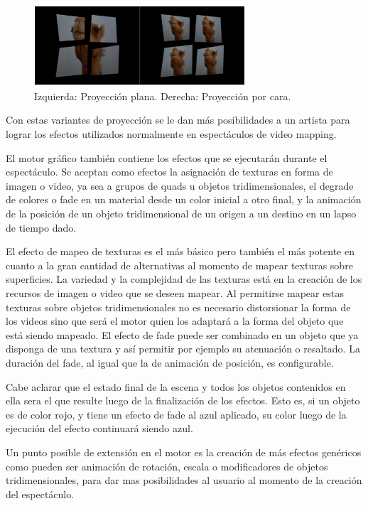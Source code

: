 \begin{figure}[H]
  \centering
    \includegraphics[width=0.7\textwidth]{./Cap5_vmt/vmtengine-maping.png}
  \caption{Izquierda: Proyección plana. Derecha: Proyección por cara.}
  \label{fig:VMT-Projection}
\end{figure}

Con estas variantes de proyección se le dan más posibilidades a un artista para lograr los efectos utilizados normalmente en espectáculos de video mapping.

El motor gráfico también contiene los efectos que se ejecutarán durante el espectáculo. Se aceptan como efectos la asignación de texturas en forma de imagen o video, ya sea a grupos de quads u objetos tridimensionales, el degrade de colores o fade en un material desde un color inicial a otro final, y la animación de la posición de un objeto tridimensional de un origen a un destino en un lapso de tiempo dado.

El efecto de mapeo de texturas es el más básico pero también el más potente en cuanto a la gran cantidad de alternativas al momento de mapear texturas sobre superficies. La variedad y la complejidad de las texturas está en la creación de los recursos de imagen o video que se deseen mapear. Al permitirse mapear estas texturas sobre objetos tridimensionales no es necesario distorsionar la forma de los videos sino que será el motor quien los adaptará a la forma del objeto que está siendo mapeado. El efecto de fade puede ser combinado en un objeto que ya disponga de una textura y así permitir por ejemplo su atenuación o resaltado. La duración del fade, al igual que la de animación de posición, es configurable.

Cabe aclarar que el estado final de la escena y todos los objetos contenidos en ella sera el que resulte luego de la finalización de los efectos. Esto es, si un objeto es de color rojo, y tiene un efecto de fade al azul aplicado, su color luego de la ejecución del efecto continuará siendo azul.

Un punto posible de extensión en el motor es la creación de más efectos genéricos como pueden ser animación de rotación, escala o modificadores de objetos tridimensionales, para dar mas posibilidades al usuario al momento de la creación del espectáculo.

